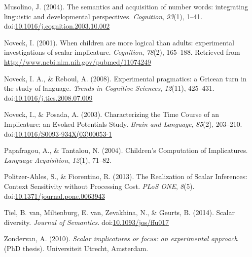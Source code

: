 \documentclass[floatsintext,man]{apa6}
\theoremstyle{definition}
\theoremstyle{definition}
\theoremstyle{definition}
\theoremstyle{remark}
\begin{document}
\hypertarget{ref-Musolino2004}{}
Musolino, J. (2004). The semantics and acquisition of number words:
integrating linguistic and developmental perspectives. \emph{Cognition},
\emph{93}(1), 1--41.
doi:\href{https://doi.org/10.1016/j.cognition.2003.10.002}{10.1016/j.cognition.2003.10.002}

\hypertarget{ref-Noveck2001}{}
Noveck, I. (2001). When children are more logical than adults:
experimental investigations of scalar implicature. \emph{Cognition},
\emph{78}(2), 165--188. Retrieved from
\url{http://www.ncbi.nlm.nih.gov/pubmed/11074249}

\hypertarget{ref-noveck2008}{}
Noveck, I. A., \& Reboul, A. (2008). Experimental pragmatics: a Gricean
turn in the study of language. \emph{Trends in Cognitive Sciences},
\emph{12}(11), 425--431.
doi:\href{https://doi.org/10.1016/j.tics.2008.07.009}{10.1016/j.tics.2008.07.009}

\hypertarget{ref-Noveck2003}{}
Noveck, I., \& Posada, A. (2003). Characterizing the Time Course of an
Implicature: an Evoked Potentials Study. \emph{Brain and Language},
\emph{85}(2), 203--210.
doi:\href{https://doi.org/10.1016/S0093-934X(03)00053-1}{10.1016/S0093-934X(03)00053-1}

\hypertarget{ref-Papafragou2004}{}
Papafragou, A., \& Tantalou, N. (2004). Children's Computation of
Implicatures. \emph{Language Acquisition}, \emph{12}(1), 71--82.

\hypertarget{ref-Politzer-Ahles2013}{}
Politzer-Ahles, S., \& Fiorentino, R. (2013). The Realization of Scalar
Inferences: Context Sensitivity without Processing Cost. \emph{PLoS
ONE}, \emph{8}(5).
doi:\href{https://doi.org/10.1371/journal.pone.0063943}{10.1371/journal.pone.0063943}

\hypertarget{ref-VanTiel2014}{}
Tiel, B. van, Miltenburg, E. van, Zevakhina, N., \& Geurts, B. (2014).
Scalar diversity. \emph{Journal of Semantics}.
doi:\href{https://doi.org/10.1093/jos/ffu017}{10.1093/jos/ffu017}

\hypertarget{ref-Zondervan2010}{}
Zondervan, A. (2010). \emph{Scalar implicatures or focus: an
experimental approach} (PhD thesis). Universiteit Utrecht, Amsterdam.
\end{document}
